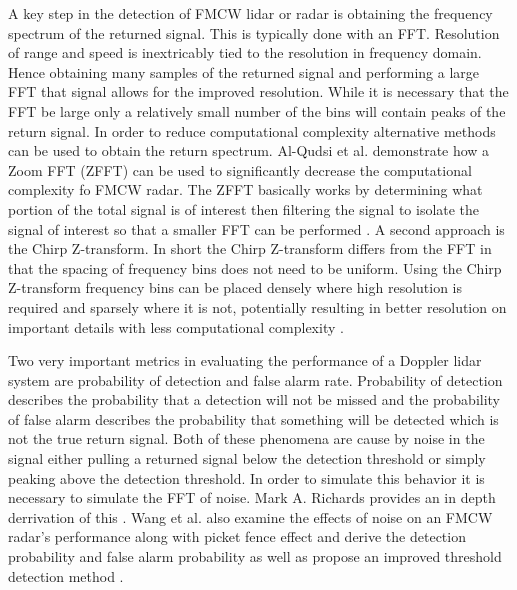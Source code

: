 A key step in the detection of FMCW lidar or radar is obtaining the frequency spectrum 
of the returned signal. This is typically done with an FFT. Resolution of range and speed
is inextricably tied to the resolution in frequency domain. Hence obtaining many samples
of the returned signal and performing a large FFT that signal allows for the improved 
resolution. While it is necessary that the FFT be large only a relatively small 
number of the bins will contain peaks of the return signal. In order to reduce computational
complexity alternative methods can be used to obtain the return spectrum. Al-Qudsi et al. demonstrate 
how a Zoom FFT (ZFFT) can be used to significantly decrease the computational complexity
fo FMCW radar. The ZFFT basically works by determining what portion of the total signal
is of interest then filtering the signal to isolate the signal of interest so that a smaller
FFT can be performed \cite{Al-QudsiZoomfft}. A second approach is the Chirp Z-transform. In short 
the Chirp Z-transform differs from the FFT in that the spacing of frequency bins does not need
to be uniform. Using the Chirp Z-transform frequency bins can be placed densely where high
resolution is required and sparsely where it is not, potentially resulting in better resolution
on important details with less computational complexity \cite{Pen-ChengChirpZ,wangThresh}. 

Two very important metrics in evaluating the performance of a Doppler lidar system are probability
of detection and false alarm rate. Probability of detection describes the probability that a detection
will not be missed and the probability of false alarm describes the probability that something will be
detected which is not the true return signal. Both of these phenomena are cause by noise in the signal
either pulling a returned signal below the detection threshold or simply peaking above the detection 
threshold. In order to simulate this behavior it is necessary to simulate the FFT of noise. Mark A. Richards
provides an in depth derrivation of this \cite{richards2007dftnoise}. Wang et al. also examine the effects
of noise on an FMCW radar's performance along with picket fence effect and derive the detection probability
and false alarm probability as well as propose an improved threshold detection method \cite{wangThresh}. 